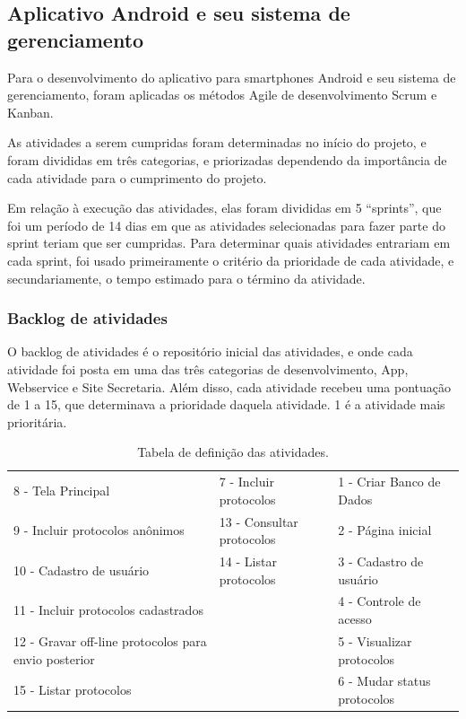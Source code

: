\documentclass[
	article,			%
	11pt,				%
	oneside,			%
	a4paper,			%
	english,			%
	brazil,				%
	sumario=tradicional
	]{abntex2}
\begin{document}
\subsection{Aplicativo Android e seu sistema de gerenciamento}

Para o desenvolvimento do aplicativo para smartphones Android e seu sistema de
gerenciamento, foram aplicadas os métodos Agile de desenvolvimento Scrum e Kanban.

As atividades a serem cumpridas foram determinadas no início do projeto, e
foram divididas em três categorias, e priorizadas dependendo da importância de
cada atividade para o cumprimento do projeto.

Em relação à execução das atividades, elas foram divididas em 5 “sprints”, que
foi um período de 14 dias em que as atividades selecionadas para fazer parte
do sprint teriam que ser cumpridas. Para determinar quais atividades entrariam
em cada sprint, foi usado primeiramente o critério da prioridade de cada
atividade, e secundariamente, o tempo estimado para o término da atividade.


\subsubsection{Backlog de atividades}

O backlog de atividades é o repositório inicial das atividades, e onde cada
atividade foi posta em uma das três categorias de desenvolvimento, App,
Webservice e Site Secretaria. Além disso, cada atividade recebeu uma pontuação
de 1 a 15, que determinava a prioridade daquela atividade. 1 é a atividade
mais prioritária.

\begin{table}[htbp]
    \caption{Tabela de definição das atividades.}
    \label{tabela-atividades}
    \begin{center}
        \begin{tabular}{|p{5cm}|p{4cm}|p{5cm}|}
            \hline
            8 - Tela Principal & 7 - Incluir protocolos & 1 - Criar Banco de Dados \\
            9 - Incluir protocolos anônimos & 13 - Consultar protocolos & 2 - Página inicial \\
            10 - Cadastro de usuário & 14 - Listar protocolos & 3 - Cadastro de usuário \\
            11 - Incluir protocolos cadastrados & & 4 - Controle de acesso \\
            12 - Gravar off-line protocolos para envio posterior & & 5 - Visualizar protocolos \\
            15 - Listar protocolos & & 6 - Mudar status protocolos \\
            \hline
        \end{tabular}
    \end{center}
\end{table}
\end{document}
